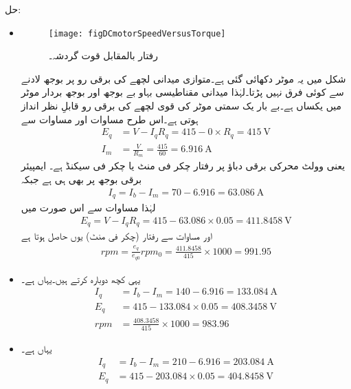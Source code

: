 حل:
\begin{itemize}
\item
%
\begin{figure}
\centering
\texttt{[image: figDCmotorSpeedVersusTorque]}
\caption{رفتار بالمقابل قوت گردشہ۔}
\label{شکل_یکسمتی_رفتار_بالمقابل_مروڑ}
\end{figure}

شکل  میں یہ موٹر دکھائی گئی ہے۔متوازی میدانی لچھے کی برقی رو پر بوجھ لادنے سے کوئی فرق نہیں پڑتا۔لہٰذا میدانی مقناطیسی بہاو بے بوجھ اور بوجھ بردار موٹر میں یکساں ہے۔بے بار یک سمتی موٹر کی قوی لچھے کی برقی رو   قابلِ نظر انداز ہوتی ہے۔اس طرح مساوات   اور مساوات   سے  
\begin{align*}
E_q&=V-I_q R_q=415-0\times R_q=\SI{415}{\volt}\\
I_m&=\frac{V}{R_m}=\frac{415}{60}=\SI{6.916}{\ampere}
\end{align*}
یعنی  وولٹ محرکی برقی دباؤ پر رفتار  چکر فی منٹ یا  چکر فی سیکنڈ ہے۔ ایمپیئر برقی بوجھ پر بھی  ہی ہے جبکہ 
\begin{align*}
I_q=I_b-I_m=70-6.916=\SI{63.086}{\ampere}
\end{align*}
لہٰذا مساوات   سے اس صورت میں
\begin{align*}
E_q=V-I_q R_q=415-63.086 \times 0.05=\SI{411.8458}{\volt}
\end{align*}
اور مساوات   سے رفتار (چکر فی منٹ) یوں حاصل ہوتا ہے
\begin{align*}
rpm=\frac{e_q}{e_{q0}} rpm_0=\frac{411.8458}{415} \times 1000=991.95
\end{align*}
%
\item
یہی کچھ دوبارہ کرتے ہیں۔یہاں  ہے۔
\begin{align*}
I_q&=I_b-I_m=140-6.916=\SI{133.084}{\ampere}\\
E_q&=415-133.084 \times 0.05=\SI{408.3458}{\volt}\\
rpm&=\frac{408.3458}{415} \times 1000=983.96
\end{align*}
%
\item
یہاں  ہے۔
\begin{align*}
I_q&=I_b-I_m=210-6.916=\SI{203.084}{\ampere}\\
E_q&=415-203.084 \times 0.05=\SI{404.8458}{\volt}\\

\end{align*}
\end{itemize}
